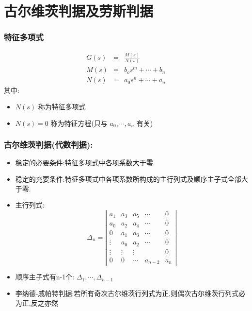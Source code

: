 \documentclass{beamer}
\begin{document}
\section{古尔维茨判据及劳斯判据}
\label{sec-2}
\begin{frame}
\frametitle{特征多项式}
\label{sec-2-1}

\begin{eqnarray*}
G(s) & = & \frac{M(s)}{N(s)}\\
M(s) &=&  b_{o}s^{m}+\cdots+b_{n} \\
N(s) & =& a_{0}s^{n}+\cdots+a_{n}
\end{eqnarray*}
其中:
\begin{itemize}
\item $N(s)$ 称为特征多项式
\item $N(s)=0$ 称为特征方程(只与 $a_{0},\cdots,a_{n}$ 有关)
\end{itemize}
\end{frame}
\begin{frame}
\frametitle{古尔维茨判据(代数判据):}
\label{sec-2-2}

\begin{itemize}
\item <2-> 稳定的必要条件:特征多项式中各项系数大于零.
\item <3-> 稳定的充要条件:特征多项式中各项系数所构成的主行列式及顺序主子式全部大于零.
\item <3-> 主行列式:
     \begin{equation*}
     \Delta_{n}=\left|
     \begin{matrix}
     a_{1}  & a_{3} & a_{5} & \cdots & 0  \\
     a_{0}  & a_{2} & a_{4} & \cdots & 0  \\
     0      & a_{1} & a_{3} & \cdots & 0  \\
     \vdots & a_{0} & a_{2} & \cdots & 0  \\
     \vdots &\vdots &\vdots &        & 0   \\
       0    &  0    & \cdots & a_{n-2}& a_{n}
     \end{matrix}
     \right|
     \end{equation*}
\item <4-> 顺序主子式有n-1个: $\Delta_{1},\cdots,\Delta_{n-1}$
\item <5-> 李纳德-戚帕特判据:若所有奇次古尔维茨行列式为正,则偶次古尔维茨行列式必为正,反之亦然
\end{itemize}
\end{frame}
\end{document}
